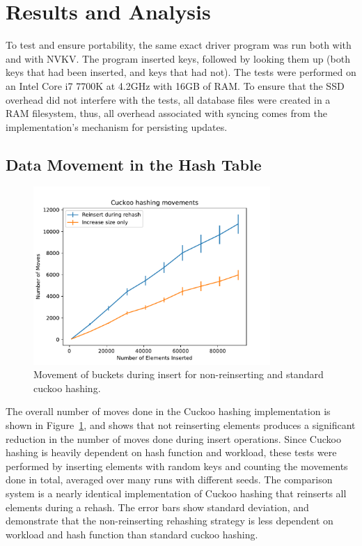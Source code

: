 \section{Results and Analysis}

To test and ensure portability, the same exact driver program was run both with
\bdb and with NVKV. The program inserted keys, followed by looking them up (both
keys that had been inserted, and keys that had not). The tests were performed on
an Intel Core i7 7700K at 4.2GHz with 16GB of RAM. To ensure that the SSD
overhead did not interfere with the tests, all database files were created in a
RAM filesystem, thus, all overhead associated with syncing comes from the
implementation's mechanism for persisting updates.

\subsection{Data Movement in the Hash Table}

\begin{figure}
\centering
\hspace*{-0.1in}
\includegraphics[width=90mm]{fig/moves}
\caption{Movement of buckets during insert for non-reinserting and standard
cuckoo hashing.}
\label{fig:moves}
\end{figure}

The overall number of moves done in the Cuckoo hashing implementation is shown
in Figure~\ref{fig:moves}, and shows that not reinserting elements produces a
significant reduction in the number of moves done during insert operations.
Since Cuckoo hashing is heavily dependent on hash function and workload, these
tests were performed by inserting elements with random keys and counting the
movements done in total, averaged over many runs with different seeds.
The comparison system is a nearly identical
implementation of Cuckoo hashing that reinserts all elements during a rehash.
The error bars show standard deviation, and demonstrate that the non-reinserting
rehashing strategy is less dependent on workload and hash function than standard
cuckoo hashing.

